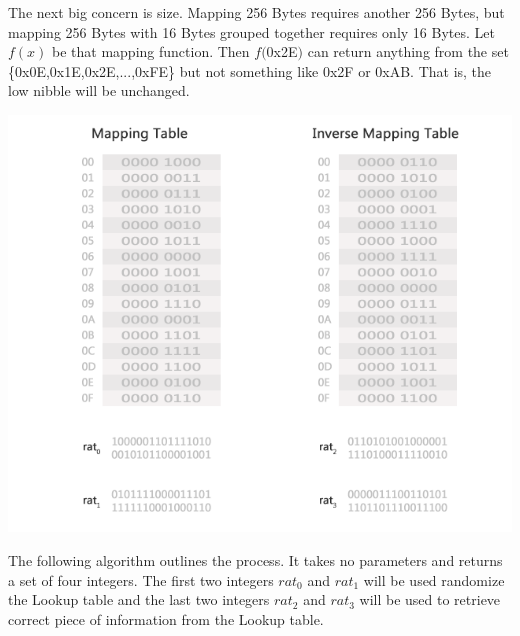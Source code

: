 The next big concern is size. Mapping 256 Bytes requires another 256 Bytes, but mapping 256 Bytes with 16 Bytes grouped together requires only 16 Bytes. Let $f(x)$ be that mapping function. Then $f($0x2E$)$ can return anything from the set \{0x0E,0x1E,0x2E,...,0xFE\} but not something like 0x2F or 0xAB. That is, the low nibble will be unchanged.

\begin{center}
\includegraphics[scale=0.4,natwidth=640,natheight=530]{psd/after.png}
\end{center}

The following algorithm outlines the process. It takes no parameters and returns a set of four integers. The first two integers $rat_0$ and $rat_1$ will be used randomize the Lookup table and the last two integers $rat_2$ and $rat_3$ will be used to retrieve correct piece of information from the Lookup table.

